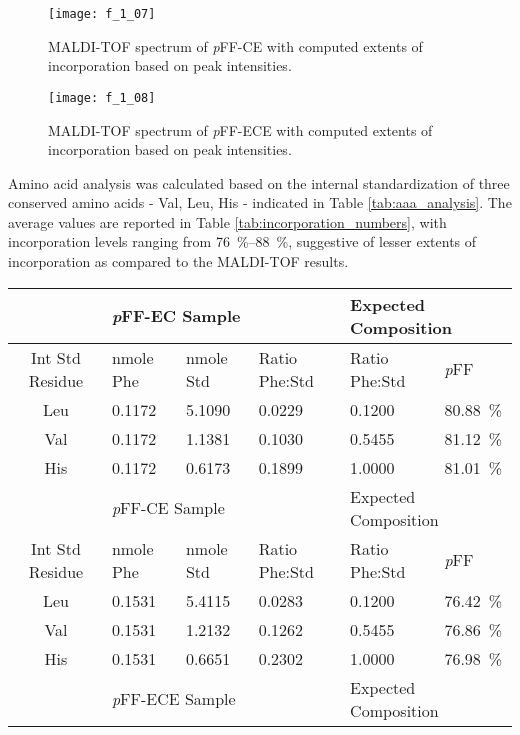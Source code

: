 \begin{refsection}
\begin{figure}[h!] \centering \texttt{[image: f\_1\_07]}
    \caption{MALDI-TOF spectrum of \emph{p}FF-CE with computed extents of
incorporation based on peak intensities.} \label{fig:MALDI_spectrum_CE} \end{figure}
\begin{figure}[h!] \centering \texttt{[image: f\_1\_08]}
    \caption{MALDI-TOF spectrum of \emph{p}FF-ECE with computed extents of
incorporation based on peak intensities.} \label{fig:MALDI_spectrum_ECE} \end{figure}
Amino acid analysis was calculated based on the internal standardization of
three conserved amino acids - Val, Leu, His - indicated in Table
\ref{tab:aaa_analysis}. The average values are reported in
Table \ref{tab:incorporation_numbers}, with incorporation levels ranging from
\SIrange{76}{88}{\percent}, suggestive of lesser extents of incorporation as
compared to the MALDI-TOF results. 
\begin{table}[h!]
    \centering
\begin{tabular}{ clllll }
  \hline
  &
  \multicolumn{3}{l}{\emph{p}FF-EC Sample} &
  \multicolumn{2}{l}{Expected Composition} \\
  \hline
  Int Std Residue & nmole Phe & nmole Std & Ratio Phe:Std & Ratio Phe:Std& \emph{p}FF \\
  Leu & 0.1172 & 5.1090 & 0.0229 & 0.1200 & \SI{80.88}{\percent} \\
  Val & 0.1172 & 1.1381 & 0.1030 & 0.5455 & \SI{81.12}{\percent} \\
  His & 0.1172 & 0.6173 & 0.1899 & 1.0000 & \SI{81.01}{\percent} \\
  \hline
  &
  \multicolumn{3}{l}{\emph{p}FF-CE Sample} &
  \multicolumn{2}{l}{Expected Composition} \\
  \hline
  Int Std Residue & nmole Phe & nmole Std & Ratio Phe:Std & Ratio Phe:Std& \emph{p}FF \\
  Leu & 0.1531 & 5.4115 & 0.0283 & 0.1200 & \SI{76.42}{\percent} \\
  Val & 0.1531 & 1.2132 & 0.1262 & 0.5455 & \SI{76.86}{\percent} \\
  His & 0.1531 & 0.6651 & 0.2302 & 1.0000 & \SI{76.98}{\percent} \\
  \hline
  &
  \multicolumn{3}{l}{\emph{p}FF-ECE Sample} &
  \multicolumn{2}{l}{Expected Composition} \\

\end{tabular}
\end{table}
\end{refsection}

